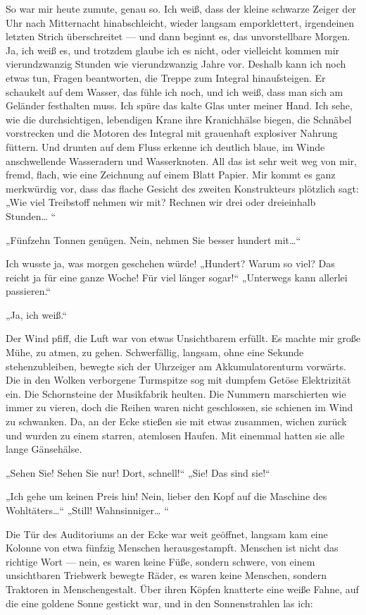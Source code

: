 So war mir heute zumute, genau so. Ich weiß, dass der kleine
schwarze Zeiger der Uhr nach Mitternacht hinabschleicht, wieder
langsam emporklettert, irgendeinen letzten Strich überschreitet —
und dann beginnt es, das unvorstellbare Morgen. Ja, ich weiß es,
und trotzdem glaube ich es nicht, oder vielleicht kommen mir
vierundzwanzig Stunden wie vierundzwanzig Jahre vor. Deshalb kann
ich noch etwas tun, Fragen beantworten, die Treppe zum Integral
hinaufsteigen. Er schaukelt auf dem Wasser, das fühle ich noch, und
ich weiß, dass man sich am Geländer festhalten muss. Ich spüre das
kalte Glas unter meiner Hand. Ich sehe, wie die durchsichtigen,
lebendigen Krane ihre Kranichhälse biegen, die Schnäbel vorstrecken
und die Motoren des Integral mit grauenhaft explosiver Nahrung
füttern. Und drunten auf dem Fluss erkenne ich deutlich blaue, im
Winde anschwellende Wasseradern und Wasserknoten. All das ist sehr
weit weg von mir, fremd, flach, wie eine Zeichnung auf einem Blatt
Papier. Mir kommt es ganz merkwürdig vor, dass das flache Gesicht
des zweiten Konstrukteurs plötzlich sagt: „Wie viel Treibstoff
nehmen wir mit? Rechnen wir drei oder dreieinhalb Stunden\ldots{} “

„Fünfzehn Tonnen genügen. Nein, nehmen Sie besser hundert mit\ldots{}“

Ich wusste ja, was morgen geschehen würde! „Hundert? Warum so viel?
Das reicht ja für eine ganze Woche! Für viel länger sogar!“
„Unterwegs kann allerlei passieren.“

„Ja, ich weiß.“

Der Wind pfiff, die Luft war von etwas Unsichtbarem erfüllt. Es
machte mir große Mühe, zu atmen, zu gehen. Schwerfällig, langsam,
ohne eine Sekunde stehenzubleiben, bewegte sich der Uhrzeiger am
Akkumulatorenturm vorwärts. Die in den Wolken verborgene Turmspitze
sog mit dumpfem Getöse Elektrizität ein. Die Schornsteine der
Musikfabrik heulten. Die Nummern marschierten wie immer zu vieren,
doch die Reihen waren nicht geschlossen, sie schienen im Wind zu
schwanken. Da, an der Ecke stießen sie mit etwas zusammen, wichen
zurück und wurden zu einem starren, atemlosen Haufen. Mit einemmal
hatten sie alle lange Gänsehälse.

„Sehen Sie! Sehen Sie nur! Dort, schnell!“ „Sie! Das sind sie!“

„Ich gehe um keinen Preis hin! Nein, lieber den Kopf auf die
Maschine des Wohltäters\ldots{}“ „Still! Wahnsinniger\ldots{} “

Die Tür des Auditoriums an der Ecke war weit geöffnet, langsam kam
eine Kolonne von etwa fünfzig Menschen herausgestampft. Menschen
ist nicht das richtige Wort — nein, es waren keine Füße, sondern
schwere, von einem unsichtbaren Triebwerk bewegte Räder, es waren
keine Menschen, sondern Traktoren in Menschengestalt. Über ihren
Köpfen knatterte eine weiße Fahne, auf die eine goldene Sonne
gestickt war, und in den Sonnenstrahlen las ich:

